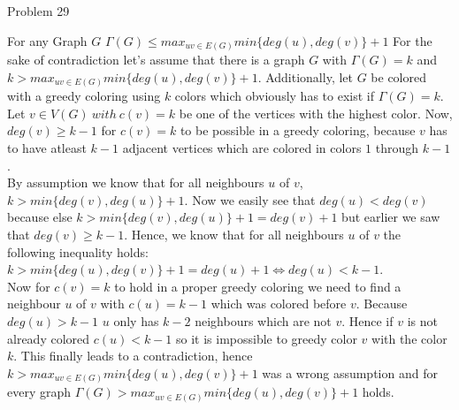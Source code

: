 \documentclass[a4paper]{article}
\begin{document}
\begin{solution}{Problem 29}
		
		\begin{theorem}{For any Graph $G$  $\Gamma(G) \leq max_{uv \in E(G)} min\{deg(u), deg(v)\} + 1$}
		For the sake of contradiction let's assume that there is a graph $G$ with $\Gamma(G) = k$ and $k > max_{uv \in E(G)} min\{deg(u), deg(v)\} + 1$. 
		Additionally, let $G$ be colored with a greedy coloring using $k$ colors which obviously has to exist if $\Gamma(G) = k$. \\
		Let $v \in V(G)\ with\ c(v) = k$ be one of the vertices with the highest color. 
		Now, $deg(v) \geq k-1$  for $c(v)=k$ to be possible in a greedy coloring, because $v$ has to have atleast $k-1$ adjacent vertices which are colored in colors $1$ through $k-1$. \\
		By assumption we know that for all neighbours $u$ of $v$, $k> min\{deg(v), deg(u)\} + 1$. 
		Now we easily see that $deg(u) < deg(v)$ because else  $k > min\{deg(v), deg(u)\} + 1 = deg(v) + 1$ but earlier we saw that $deg(v) \geq k-1$. 
		Hence, we know that for all neighbours $u$ of $v$ the following inequality holds: $k > min\{deg(u), deg(v)\} + 1 = deg(u) + 1 \Leftrightarrow deg(u) < k - 1$. \\
		Now for $c(v)=k$ to hold in a proper greedy coloring we need to find a neighbour $u$ of $v$ with $c(u)=k-1$ which was colored before $v$. 
		Because $deg(u) > k-1$ $u$ only has $k-2$ neighbours which are not $v$. 
		Hence if $v$ is not already colored $c(u) < k-1$ so it is impossible to greedy color $v$ with the color $k$. 
		This finally leads to a contradiction, hence $k > max_{uv \in E(G)} min\{deg(u), deg(v)\} + 1$ was a wrong assumption and for every graph $\Gamma(G) > max_{uv \in E(G)} min\{deg(u), deg(v)\} + 1$ holds.
		\end{theorem}
	\end{solution}
	
\end{document}
